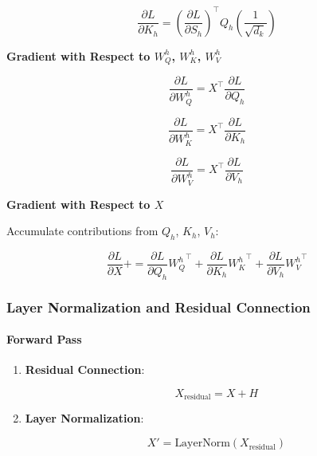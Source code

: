 \documentclass{article}
\begin{document}
\begin{equation}
    \frac{\partial L}{\partial K_h} = \left( \frac{\partial L}{\partial S_h} \right)^\top Q_h \left( \frac{1}{\sqrt{d_k}} \right)
\end{equation}

\textbf{Gradient with Respect to $W_Q^h$, $W_K^h$, $W_V^h$}

\begin{equation}
    \frac{\partial L}{\partial W_Q^h} = X^\top \frac{\partial L}{\partial Q_h}
\end{equation}

\begin{equation}
    \frac{\partial L}{\partial W_K^h} = X^\top \frac{\partial L}{\partial K_h}
\end{equation}

\begin{equation}
    \frac{\partial L}{\partial W_V^h} = X^\top \frac{\partial L}{\partial V_h}
\end{equation}

\textbf{Gradient with Respect to $X$}

Accumulate contributions from $Q_h$, $K_h$, $V_h$:

\begin{equation}
    \frac{\partial L}{\partial X} += \frac{\partial L}{\partial Q_h} {W_Q^h}^\top + \frac{\partial L}{\partial K_h} {W_K^h}^\top + \frac{\partial L}{\partial V_h} {W_V^h}^\top
\end{equation}

\subsubsection{Layer Normalization and Residual Connection}

\paragraph{Forward Pass}

\begin{enumerate}
    \item \textbf{Residual Connection}:

    \begin{equation}
        X_{\text{residual}} = X + H
    \end{equation}

    \item \textbf{Layer Normalization}:

    \begin{equation}
        X' = \text{LayerNorm}(X_{\text{residual}})
    \end{equation}
\end{enumerate}
\end{document}
